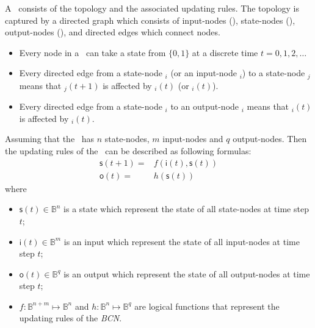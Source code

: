 \begin{definition} A \BCN\ consists of the  topology and the associated updating rules. The topology is captured by a directed graph which consists of input-nodes (\Input), state-nodes (\State), output-nodes (\Output), and directed edges which connect nodes. 
	\begin{itemize}
	\item Every node in a \BCN\ can take a state from $\{0,1\}$ at a discrete time $t=0, 1, 2,\ldots$ 
	
	\item Every directed edge from a state-node \State$_i$ (or an input-node \Input$_i$) to a state-node \State$_j$ means that  \State$_j(t+1)$ is affected by  \State$_i(t)$ (or \Input$_i(t)$). 
	
	\item Every directed edge from a state-node \State$_i$ to an output-node \Output$_i$ means that   \Output$_i(t)$  is affected by   \State$_i(t)$.  
	\end{itemize}

Assuming that the \BCN\ has $n$ state-nodes, $m$ input-nodes and $q$ output-nodes. Then the updating rules of the \BCN\ can be described as following formulas:
\begin{equation}
\begin{split}
\mathsf{s}(t+1)=&f(\mathsf{i}(t),\mathsf{s}(t))\\
\mathsf{o}(t)=&h(\mathsf{s}(t))
\end{split}
\label{equ:1}
\end{equation}
where
\begin{itemize}
	\item $\mathsf{s}(t)\in \mathbb{B}^n$ is a state which represent the state of all state-nodes at time step $t$; 	
	\item $\mathsf{i}(t)\in \mathbb{B}^m$ is an input which represent the state of all input-nodes at time step $t$; 	
	\item $\mathsf{o}(t)\in \mathbb{B}^q$ is an output which represent the state of all output-nodes at time step $t$;  
	\item $f:\mathbb{B}^{n+m}\mapsto \mathbb{B}^n$ and $h:\mathbb{B}^n\mapsto \mathbb{B}^q$ are logical functions that represent the updating rules of the {\em BCN}. 
\end{itemize}
 

\end{definition}

